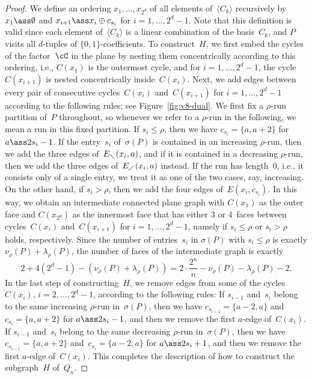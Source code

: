 \begin{proof}
We define an ordering $x_1,\ldots,x_{2^d}$ of all elements of~$\langle C_k\rangle$ recursively by $x_1\ass \emptyset$ and $x_{i+1}\ass x_i\oplus c_{s_i}$ for $i=1,\ldots,2^d-1$.
Note that this definition is valid since each element of~$\langle C_k\rangle$ is a linear combination of the basis~$C_k$, and $P$ visits all $d$-tuples of $\{0,1\}$-coefficients.
%
To construct~$H$, we first embed the cycles of the factor~$\cC$ in the plane by nesting them concentrically according to this ordering, i.e., $C(x_1)$ is the outermost cycle, and for $i=1,\ldots,2^d-1$, the cycle $C(x_{i+1})$ is nested concentrically inside~$C(x_i)$.
%
Next, we add edges between every pair of consecutive cycles~$C(x_i)$ and~$C(x_{i+1})$ for $i=1,\ldots,2^d-1$ according to the following rules; see Figure~\ref{fig:v8-dual}.
We first fix a $\rho$-run partition of~$P$ throughout, so whenever we refer to a $\rho$-run in the following, we mean a run in this fixed partition.
If $s_i\leq \rho$, then we have $c_{s_i}=\{a,a+2\}$ for $a\ass 2s_i-1$.
If the entry~$s_i$ of~$\sigma(P)$ is contained in an increasing $\rho$-run, then we add the three edges of~$E_{\diagdown}(x_i,a)$, and if it is contained in a decreasing $\rho$-run, then we add the three edges of~$E_{\diagup}(x_i,a)$ instead.
If the run has length~0, i.e., it consists only of a single entry, we treat it as one of the two cases, say, increasing.
On the other hand, if $s_i>\rho$, then we add the four edges of~$E(x_i,c_{s_i})$.
%
In this way, we obtain an intermediate connected plane graph with $C(x_1)$ as the outer face and $C(x_{2^d})$ as the innermost face that has either 3 or 4~faces between cycles~$C(x_i)$ and~$C(x_{i+1})$ for $i=1,\dots,2^d-1$, namely if $s_i \leq \rho$ or $s_i>\rho$ holds, respectively.
Since the number of entries~$s_i$ in $\sigma(P)$ with $s_i\leq \rho$ is exactly $\nu_\rho(P)+\lambda_\rho(P)$, the number of faces of the intermediate graph is exactly
\[ 2+4(2^d-1)-(\nu_\rho(P)+\lambda_\rho(P))=2\cdot \frac{2^n}{n}-\nu_\rho(P)-\lambda_\rho(P)-2. \]
%
In the last step of constructing~$H$, we remove edges from some of the cycles~$C(x_i)$, $i=2,\ldots,2^d-1$, according to the following rules:
If $s_{i-1}$ and~$s_i$ belong to the same increasing $\rho$-run in~$\sigma(P)$, then we have $c_{s_{i-1}}=\{a-2,a\}$ and~$c_{s_i}=\{a,a+2\}$ for $a\ass 2s_i-1$, and then we remove the first $a$-edge of~$C(x_i)$.
If $s_{i-1}$ and~$s_i$ belong to the same decreasing $\rho$-run in~$\sigma(P)$, then we have $c_{s_{i-1}}=\{a,a+2\}$ and~$c_{s_i}=\{a-2,a\}$ for $a\ass 2s_i+1$, and then we remove the first $a$-edge of~$C(x_i)$.
This completes the description of how to construct the subgraph~$H$ of~$Q_n$.

\end{proof}
